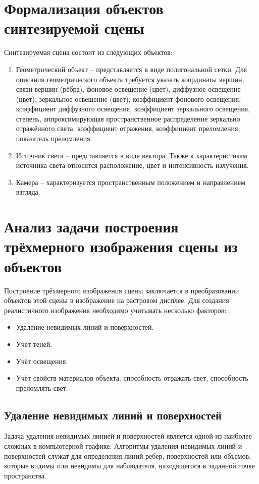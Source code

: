 \section{Формализация объектов синтезируемой сцены}

Синтезируемая сцена состоит из следующих объектов:
\begin{enumerate}[label=\arabic*)]
	\item Геометрический объект -- представляется в виде полигональной сетки. Для описания геометрического объекта требуется указать координаты вершин, связи вершин (рёбра), фоновое освещение (цвет), диффузное освещение (цвет), зеркальное освещение (цвет), коэффициент фонового освещения, коэффициент диффузного освещения, коэффициент зеркального освещения, степень, аппроксимирующая пространственное распределение зеркально отражённого света, коэффициент отражения, коэффициент преломления, показатель преломления.
	\item Источник света -- представляется в виде вектора. Также к характеристикам источника света относятся расположение, цвет и интенсивность излучения.
	\item Камера -- характеризуется пространственным положением и направлением взгляда.
\end{enumerate}

\section{Анализ задачи построения трёхмерного изображения сцены из объектов}

Построение трёхмерного изображения сцены заключается в преобразовании объектов этой сцены
в изображение на растровом дисплее. Для создания реалистичного изображения необходимо учитывать несколько факторов:
\begin{itemize}
	\item Удаление невидимых линий и поверхностей.
	\item Учёт теней.
	\item Учёт освещения. 
	\item Учёт свойств материалов объекта: способность отражать свет, способность преломлять свет.
\end{itemize}

\subsection{Удаление невидимых линий и поверхностей}

Задача удаления невидимых линией и поверхностей является одной из наиболее сложных в компьютерной графике. 
Алгоритмы удаления невидимых линий и поверхностей служат для определения линий ребер, поверхностей или объемов, которые видимы или невидимы для наблюдателя, находящегося в заданной точке пространства.

